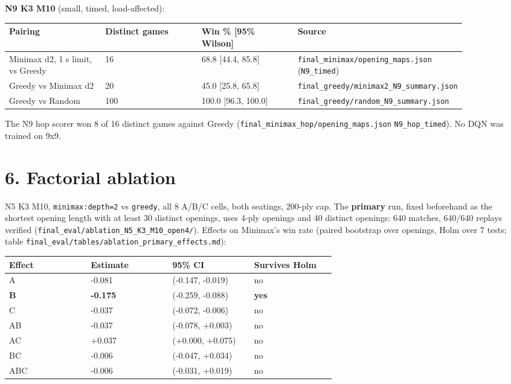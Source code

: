 \documentclass[11pt]{article}
\begin{document}
\textbf{N9 K3 M10} (small, timed, load-affected):

\begin{center}\scriptsize
\begin{longtable}{p{0.22\linewidth}p{0.22\linewidth}p{0.22\linewidth}p{0.22\linewidth}}
\toprule
Pairing & Distinct games & Win \% [95\% Wilson] & Source \\
\midrule
Minimax d2, 1 s limit, vs Greedy & 16 & 68.8 [44.4, 85.8] & \texttt{final\_minimax/opening\_maps.json} (\texttt{N9\_timed}) \\
Greedy vs Minimax d2 & 20 & 45.0 [25.8, 65.8] & \texttt{final\_greedy/minimax2\_N9\_summary.json} \\
Greedy vs Random & 100 & 100.0 [96.3, 100.0] & \texttt{final\_greedy/random\_N9\_summary.json} \\
\bottomrule
\end{longtable}
\end{center}

The N9 hop scorer won 8 of 16 distinct games against Greedy (\texttt{final\_minimax\_hop/opening\_maps.json}
\texttt{N9\_hop\_timed}). No DQN was trained on 9x9.

\section{6. Factorial ablation}

N5 K3 M10, \texttt{minimax:depth=2} vs \texttt{greedy}, all 8 A/B/C cells, both seatings, 200-ply cap. The
\textbf{primary} run, fixed beforehand as the shortest opening length with at least 30 distinct
openings, uses 4-ply openings and 40 distinct openings: 640 matches, 640/640 replays verified
(\texttt{final\_eval/ablation\_N5\_K3\_M10\_open4/}). Effects on Minimax's win rate (paired bootstrap over
openings, Holm over 7 tests; table \texttt{final\_eval/tables/ablation\_primary\_effects.md}):

\begin{center}\scriptsize
\begin{longtable}{p{0.22\linewidth}p{0.22\linewidth}p{0.22\linewidth}p{0.22\linewidth}}
\toprule
Effect & Estimate & 95\% CI & Survives Holm \\
\midrule
A & -0.081 & (-0.147, -0.019) & no \\
\textbf{B} & \textbf{-0.175} & (-0.259, -0.088) & \textbf{yes} \\
C & -0.037 & (-0.072, -0.006) & no \\
AB & -0.037 & (-0.078, +0.003) & no \\
AC & +0.037 & (+0.000, +0.075) & no \\
BC & -0.006 & (-0.047, +0.034) & no \\
ABC & -0.006 & (-0.031, +0.019) & no \\
\bottomrule
\end{longtable}
\end{center}
\end{document}
